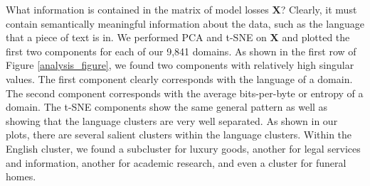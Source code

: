 \documentclass{article} %
\begin{document}
What information is contained in the matrix of model losses $\mathbf{X}$? Clearly, it must contain semantically meaningful information about the data, such as the language that a piece of text is in. We performed PCA \citep{pca} and t-SNE \citep{tsne} on $\mathbf{X}$ and plotted the first two components for each of our 9,841 domains. As shown in the first row of Figure \ref{analysis_figure}, we found two components with relatively high singular values. The first component clearly corresponds with the language of a domain. The second component corresponds with the average bits-per-byte or entropy of a domain. The t-SNE components show the same general pattern as well as showing that the language clusters are very well separated. As shown in our plots, there are several salient clusters within the language clusters. Within the English cluster, we found a subcluster for luxury goods, another for legal services and information, another for academic research, and even a cluster for funeral homes.
\end{document}

